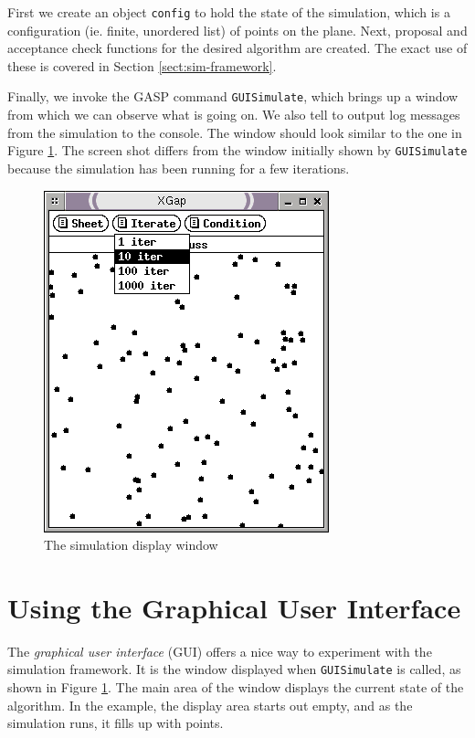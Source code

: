 First we create an object \texttt{config} to hold the state of the
simulation, which is a configuration (ie. finite, unordered list) of
points on the plane.  Next, proposal and acceptance check functions
for the desired algorithm are created.  The exact use of these is
covered in Section \ref{sect:sim-framework}.

Finally, we invoke the GASP command \texttt{GUISimulate}, which brings
up a window from which we can observe what is going on.  We also tell
\GAP{} to output log messages from the simulation to the console.  The
window should look similar to the one in Figure
\ref{fig:strauss-screenshot}.  The screen shot differs from the window
initially shown by \texttt{GUISimulate} because the simulation has
been running for a few iterations.

\begin{figure}[hbt]
\centering
\includegraphics{strauss}
\caption{The simulation display window}
\label{fig:strauss-screenshot}
\end{figure}

\section{Using the Graphical User Interface}

The \emph{graphical user interface} (GUI) offers a nice way to
experiment with the simulation framework.  It is the window displayed
when \texttt{GUISimulate} is called, as shown in Figure
\ref{fig:strauss-screenshot}.  The main area of the window displays
the current state of the algorithm.  In the example, the display area
starts out empty, and as the simulation runs, it fills up with points.

